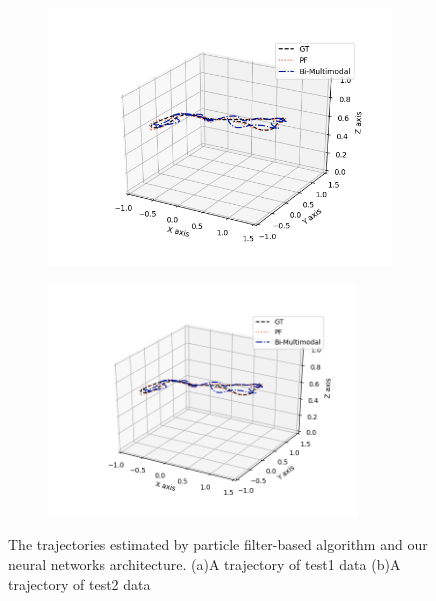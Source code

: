 \documentclass[letterpaper, 10 pt, conference]{ieeeconf}  %
\begin{document}
 
 \begin{figure}[h]
 	\centering
 	\begin{subfigure}[b]{.50\textwidth}
 		\centering
 		\includegraphics[width=.9\textwidth]{PF_multimodal_comparison2}
 		\label{fig:trajectory1} 	
 		\caption{}
 	\end{subfigure}%
 	\begin{subfigure}[b]{.50\textwidth}
 		\centering
 		\includegraphics[width=0.9\textwidth]{PF_multimodal_comparison2}
 		\label{fig:trajectory2} 	
 		\caption{}
 	\end{subfigure}
 	\caption{The trajectories estimated by particle filter-based algorithm and our neural networks architecture. (a)A trajectory of test1 data (b)A trajectory of test2 data}
 	\label{fig:trajectory}
 \end{figure} 
 
\end{document}
